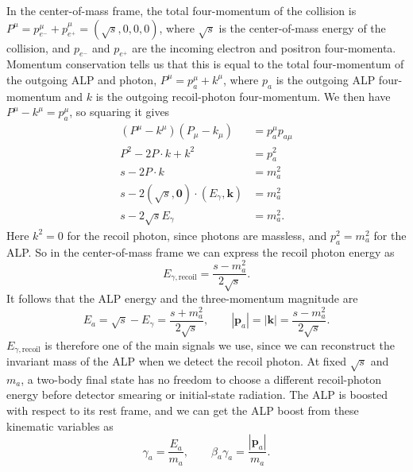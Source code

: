 \documentclass[12pt,a4paper]{article}
\begin{document}
In the center-of-mass frame, the total four-momentum of the collision is
$P^\mu=p_{e^-}^\mu+p_{e^+}^\mu=(\sqrt{s},0,0,0)$, where $\sqrt{s}$ is the
center-of-mass energy of the collision, and $p_{e^-}$ and $p_{e^+}$ are the
incoming electron and positron four-momenta. Momentum conservation tells us
that this is equal to the total four-momentum of the outgoing ALP and photon,
$P^\mu=p_a^\mu+k^\mu$, where $p_a$ is the outgoing ALP four-momentum and $k$
is the outgoing recoil-photon four-momentum. We then have $P^\mu-k^\mu=p_a^\mu$,
so squaring it gives
\begin{align}
    (P^\mu-k^\mu)(P_\mu-k_\mu)&=p_a^\mu p_{a\mu}
    \nonumber\\
    P^2-2P\cdot k+k^2&=p_a^{2}
    \nonumber\\
    s-2P\cdot k&=m_{a}^{2}
    \nonumber\\
    s-2(\sqrt{s}, \mathbf{0})\cdot (E_\gamma,\mathbf{k})&=m_{a}^{2}
    \nonumber\\
    s-2\sqrt{s} E_\gamma&=m_{a}^{2}.
    \label{eq:recoil_energy_derivation}
\end{align}
Here $k^2=0$ for the recoil photon, since photons are massless, and
$p_a^2=m_{a}^2$ for the ALP. So in the center-of-mass frame we can express the
recoil photon energy as
\begin{equation}
    E_{\gamma,\mathrm{recoil}}=\frac{s-m_{a}^2}{2\sqrt{s}}.
    \label{eq:Egamma}
\end{equation}
It follows that the ALP energy and the three-momentum magnitude are
\begin{equation}
    E_a
    =
    \sqrt{s}-E_\gamma
    =
    \frac{s+m_{a}^2}{2\sqrt{s}},
    \qquad
    |\mathbf{p}_a|
    =
    |\mathbf{k}|
    =
    \frac{s-m_{a}^2}{2\sqrt{s}}.
    \label{eq:two_body_kinematics}
\end{equation}
$E_{\gamma,\mathrm{recoil}}$ is therefore one of the main signals we use,
since we can reconstruct the invariant mass of the ALP when we detect the
recoil photon. At fixed $\sqrt{s}$ and $m_{a}$, a two-body final state has no
freedom to choose a different recoil-photon energy before detector smearing or
initial-state radiation. The ALP is boosted with respect to its rest frame, and
we can get the ALP boost from these kinematic variables as
\begin{equation}
    \gamma_a=\frac{E_a}{m_{a}},
    \qquad
    \beta_a\gamma_a=\frac{|\mathbf{p}_a|}{m_{a}}.
    \label{eq:boost}
\end{equation}
\end{document}

